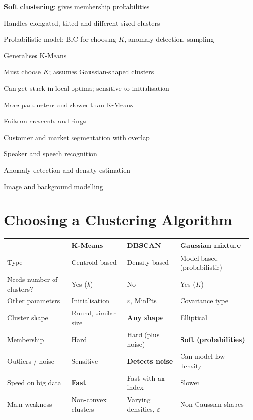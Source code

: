 {\item \textbf{Soft clustering}: gives membership probabilities
 \item Handles elongated, tilted and different-sized clusters
 \item Probabilistic model: BIC for choosing $K$, anomaly detection, sampling
 \item Generalises K-Means}
{\item Must choose $K$; assumes Gaussian-shaped clusters
 \item Can get stuck in local optima; sensitive to initialisation
 \item More parameters and slower than K-Means
 \item Fails on crescents and rings}
{\item Customer and market segmentation with overlap
 \item Speaker and speech recognition
 \item Anomaly detection and density estimation
 \item Image and background modelling}

\section{Choosing a Clustering Algorithm}

\begin{center}
\small
\begin{tabular}{@{}p{3.1cm}p{3.5cm}p{3.5cm}p{3.5cm}@{}}
\toprule
 & \textbf{K-Means} & \textbf{DBSCAN} & \textbf{Gaussian mixture}\\
\midrule
Type & Centroid-based & Density-based & Model-based (probabilistic)\\
Needs number of clusters? & Yes ($k$) & No & Yes ($K$)\\
Other parameters & Initialisation & $\varepsilon$, MinPts & Covariance type\\
Cluster shape & Round, similar size & \textbf{Any shape} & Elliptical\\
Membership & Hard & Hard (plus noise) & \textbf{Soft (probabilities)}\\
Outliers / noise & Sensitive & \textbf{Detects noise} & Can model low density\\
Speed on big data & \textbf{Fast} & Fast with an index & Slower\\
Main weakness & Non-convex clusters & Varying densities, $\varepsilon$ & Non-Gaussian shapes\\
\bottomrule
\end{tabular}
\end{center}

